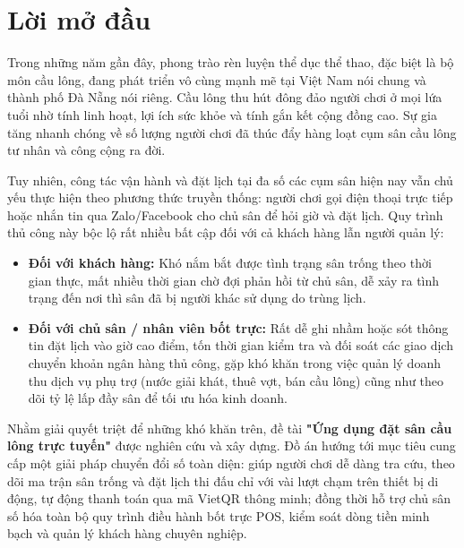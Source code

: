 \chapter*{Lời mở đầu}

Trong những năm gần đây, phong trào rèn luyện thể dục thể thao, đặc biệt là bộ môn cầu lông, đang phát triển vô cùng mạnh mẽ tại Việt Nam nói chung và thành phố Đà Nẵng nói riêng. Cầu lông thu hút đông đảo người chơi ở mọi lứa tuổi nhờ tính linh hoạt, lợi ích sức khỏe và tính gắn kết cộng đồng cao. Sự gia tăng nhanh chóng về số lượng người chơi đã thúc đẩy hàng loạt cụm sân cầu lông tư nhân và công cộng ra đời.

Tuy nhiên, công tác vận hành và đặt lịch tại đa số các cụm sân hiện nay vẫn chủ yếu thực hiện theo phương thức truyền thống: người chơi gọi điện thoại trực tiếp hoặc nhắn tin qua Zalo/Facebook cho chủ sân để hỏi giờ và đặt lịch. Quy trình thủ công này bộc lộ rất nhiều bất cập đối với cả khách hàng lẫn người quản lý:
\begin{itemize}
    \item \textbf{Đối với khách hàng:} Khó nắm bắt được tình trạng sân trống theo thời gian thực, mất nhiều thời gian chờ đợi phản hồi từ chủ sân, dễ xảy ra tình trạng đến nơi thì sân đã bị người khác sử dụng do trùng lịch.
    \item \textbf{Đối với chủ sân / nhân viên bốt trực:} Rất dễ ghi nhầm hoặc sót thông tin đặt lịch vào giờ cao điểm, tốn thời gian kiểm tra và đối soát các giao dịch chuyển khoản ngân hàng thủ công, gặp khó khăn trong việc quản lý doanh thu dịch vụ phụ trợ (nước giải khát, thuê vợt, bán cầu lông) cũng như theo dõi tỷ lệ lấp đầy sân để tối ưu hóa kinh doanh.
\end{itemize}

Nhằm giải quyết triệt để những khó khăn trên, đề tài \textbf{"Ứng dụng đặt sân cầu lông trực tuyến"} được nghiên cứu và xây dựng. Đồ án hướng tới mục tiêu cung cấp một giải pháp chuyển đổi số toàn diện: giúp người chơi dễ dàng tra cứu, theo dõi ma trận sân trống và đặt lịch thi đấu chỉ với vài lượt chạm trên thiết bị di động, tự động thanh toán qua mã VietQR thông minh; đồng thời hỗ trợ chủ sân số hóa toàn bộ quy trình điều hành bốt trực POS, kiểm soát dòng tiền minh bạch và quản lý khách hàng chuyên nghiệp.

